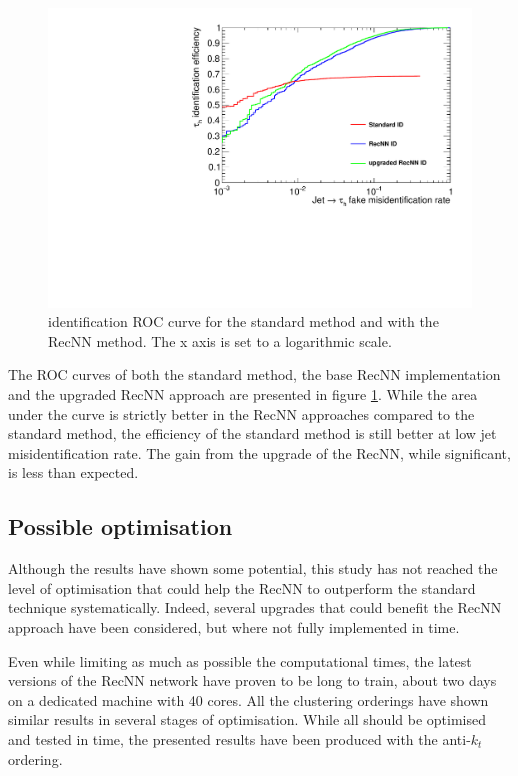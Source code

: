 \begin{figure}
    \centering
    \includegraphics[width=\textwidth]{Images/ROC_comp_all.pdf}
    \caption{\tauh identification ROC curve for the standard method and with the RecNN method. The x axis is set to a logarithmic scale.}
    \label{fig:RecNN_ROC}
\end{figure}

The ROC curves of both the standard method, the base RecNN implementation and the upgraded RecNN approach are presented in figure \ref{fig:RecNN_ROC}. While the area under the curve is strictly better in the RecNN approaches compared to the standard method, the efficiency of the standard method is still better at low jet misidentification rate. The gain from the upgrade of the RecNN, while significant, is less than expected. 


\subsection{Possible optimisation}

Although the results have shown some potential, this study has not reached the level of optimisation that could help the RecNN to outperform the standard technique systematically. Indeed, several upgrades that could benefit the RecNN approach have been considered, but where not fully implemented in time. 

Even while limiting as much as possible the computational times, the latest versions of the RecNN network have proven to be long to train, about two days on a dedicated machine with 40 cores. All the clustering orderings have shown similar results in several stages of optimisation. While all should be optimised and tested in time, the presented results have been produced with the anti-$k_t$ ordering.

